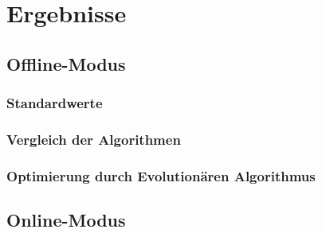 \chapter{Ergebnisse}

\section{Offline-Modus}
\subsection{Standardwerte}
\subsection{Vergleich der Algorithmen}
\subsection{Optimierung durch Evolutionären Algorithmus}

\section{Online-Modus}
